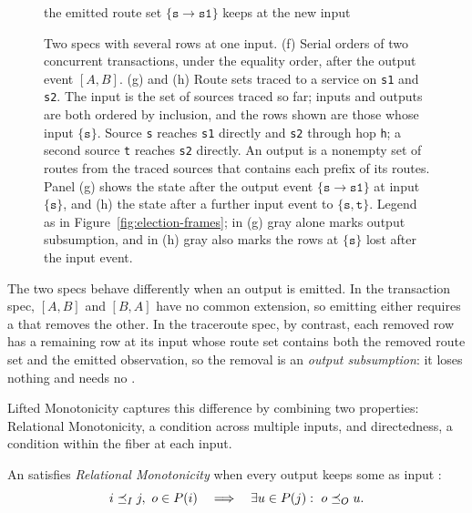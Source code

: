 \begin{figure}[t]
\begin{minipage}[t]{0.405\textwidth}
    {\footnotesize the emitted route set $\{\texttt{s}{\to}\texttt{s1}\}$ keeps \outnouns at the new input}
  \end{minipage}
  \caption{Two specs with several rows at one input.  (f) Serial orders of two
  concurrent transactions, under the equality order, after the output event
  $[A,B]$.  (g) and (h) Route sets traced to a service on \texttt{s1} and
  \texttt{s2}.  The input is the set of sources traced so far; inputs and
  outputs are both ordered by inclusion, and the rows shown are those whose
  input \inrel $\{\texttt{s}\}$.  Source \texttt{s} reaches \texttt{s1} directly and
  \texttt{s2} through hop \texttt{h}; a second source \texttt{t} reaches
  \texttt{s2} directly.  An output is a nonempty set of routes from the traced
  sources that contains each prefix of its routes.  Panel (g) shows the state
  after the output event $\{\texttt{s}{\to}\texttt{s1}\}$ at input
  $\{\texttt{s}\}$, and (h) the state after a further input event to
  $\{\texttt{s},\texttt{t}\}$.  Legend as in Figure~\ref{fig:election-frames};
  in (g) gray alone marks output subsumption, and in (h) gray also marks the
  rows at $\{\texttt{s}\}$ lost after the input event.}
  \label{fig:ambiguity-frames}
\end{figure}

The two specs behave differently when an output is emitted.  In the transaction
spec, $[A,B]$ and $[B,A]$ have no common extension, so emitting either requires a
\commitment that removes the other.  In the traceroute spec, by contrast, each
removed row has a remaining row at its input whose route set contains both the
removed route set and the emitted observation, so the removal is an
\emph{output subsumption}: it loses nothing and needs no \commitment.

Lifted Monotonicity captures this difference by combining two properties:
Relational Monotonicity, a condition across multiple inputs, and directedness,
a condition within the fiber at each input.

\label{sec:lifted-monotonicity}
\begin{definition}
\label{def:relational-monotonicity}
An \spectype satisfies \emph{Relational Monotonicity}
when every output keeps some \outnoun as input \ingrows:
        \begin{equation}
  i\preceq_I j,\ o\in P(i)
  \quad\Longrightarrow\quad
  \exists u\in P(j):\ o\preceq_O u.
  \label{eq:relational-monotonicity}
        \end{equation}
\end{definition}

